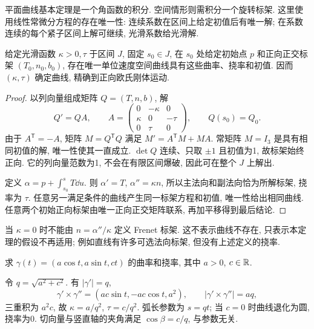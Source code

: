 平面曲线基本定理是一个角函数的积分. 空间情形则需积分一个旋转标架. 这里使用线性常微分方程的存在唯一性: 连续系数在区间上给定初值后有唯一解; 在系数连续的每个紧子区间上解可继续, 光滑系数给光滑解.
\begin{theorem}\label{thm:space-fundamental}
给定光滑函数 $\kappa>0,\tau$ 于区间 $J$, 固定 $s_0\in J$, 在 $s_0$ 处给定初始点 $p$ 和正向正交标架 $(T_0,n_0,b_0)$, 存在唯一单位速度空间曲线具有这些曲率、挠率和初值. 因而 $(\kappa,\tau)$ 确定曲线, 精确到正向欧氏刚体运动.
\end{theorem}
\begin{proof}
以列向量组成矩阵 $Q=(T,n,b)$, 解
\[
 Q'=QA,\qquad A=\begin{pmatrix}0&-\kappa&0\\\kappa&0&-\tau\\0&\tau&0\end{pmatrix},\qquad Q(s_0)=Q_0.
\]
由于 $A^{\mathsf T}=-A$, 矩阵 $M=Q^{\mathsf T}Q$ 满足 $M'=A^{\mathsf T}M+MA$. 常矩阵 $M=I_3$ 是具有相同初值的解, 唯一性使其一直成立. $\det Q$ 连续、只取 $\pm1$ 且初值为1, 故标架始终正向. 它的列向量范数为1, 不会在有限区间爆破, 因此可在整个 $J$ 上解出.

定义 $\alpha=p+\int_{s_0}^s T\dd u$. 则 $\alpha'=T$, $\alpha''=\kappa n$, 所以主法向和副法向恰为所解标架, 挠率为 $\tau$. 任意另一满足条件的曲线产生同一标架方程和初值, 唯一性给出相同曲线. 任意两个初始正向标架由唯一正向正交矩阵联系, 再加平移得到最后结论.
\end{proof}
当 $\kappa=0$ 时不能由 $n=\alpha''/\kappa$ 定义 Frenet 标架. 这不表示曲线不存在, 只表示本定理的假设不再适用; 例如直线有许多可选法向标架, 但没有上述定义的挠率.
\begin{example}
求 $\gamma(t)=(a\cos t,a\sin t,ct)$ 的曲率和挠率, 其中 $a>0$, $c\in\mathbb R$.
\end{example}
\begin{solution}
令 $q=\sqrt{a^2+c^2}$. 有 $|\gamma'|=q$,
\[
 \gamma'\times\gamma''=(ac\sin t,-ac\cos t,a^2),\qquad
 |\gamma'\times\gamma''|=aq,
\]
三重积为 $a^2c$, 故 $\kappa=a/q^2$, $\tau=c/q^2$. 弧长参数为 $s=qt$; 当 $c=0$ 时曲线退化为圆, 挠率为0. 切向量与竖直轴的夹角满足 $\cos\beta=c/q$, 与参数无关.
\end{solution}
\begin{center}
\end{center}
